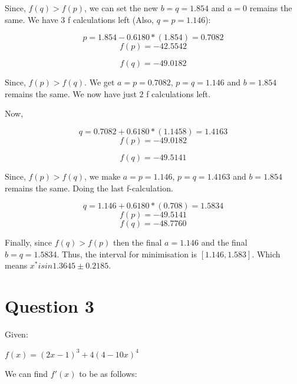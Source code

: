 \documentclass[a4paper]{article}
\begin{document}
Since, $f(q) > f(p)$, we can set the new $b = q = 1.854$ and $a = 0$ remains the same. We have $3$ f calculations left (Also, $q = p = 1.146$):

\begin{equation}
p = 1.854  - 0.6180*(1.854) = 0.7082
\end{equation}
\begin{equation}
f(p) = -42.5542
\end{equation}

\begin{equation}
f(q) = -49.0182
\end{equation}

Since, $f(p) > f(q)$. We get $a = p = 0.7082 $, $p = q = 1.146$ and $b = 1.854$ remains the same. We now have just $2$ f calculations left. 

Now, 

\begin{equation}
q = 0.7082 + 0.6180*(1.1458) = 1.4163
\end{equation}
\begin{equation}
f(p) = -49.0182
\end{equation}

\begin{equation}
f(q) = -49.5141
\end{equation}

Since, $f(p) > f(q)$, we make $a = p = 1.146$, $p = q = 1.4163$ and $b = 1.854$ remains the same. Doing the last f-calculation. 

\begin{equation}
q = 1.146 + 0.6180*(0.708) = 1.5834
\end{equation}
\begin{equation}
f(p) = -49.5141
\end{equation}
\begin{equation}
f(q) = -48.7760
\end{equation}

Finally, since $f(q) > f(p)$ then the final $a = 1.146$ and the final $b = q = 1.5834$. Thus, the interval for minimisation is $[1.146, 1.583]$.  Which means $x^* is in1.3645 \pm 0.2185$.

\section*{Question 3}

Given:

$
f(x) = (2x − 1)^3 + 4(4 − 10x)^4
$

We can find $f'(x)$ to be as follows:
\end{document}
